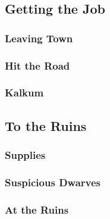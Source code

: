 

\subsection{Getting the Job}


\subsubsection{Leaving Town}


\subsubsection{Hit the Road}


\subsubsection{Kalkum}


\subsection{To the Ruins}


\subsubsection{Supplies}


\subsubsection{Suspicious Dwarves}


\subsubsection{At the Ruins}

